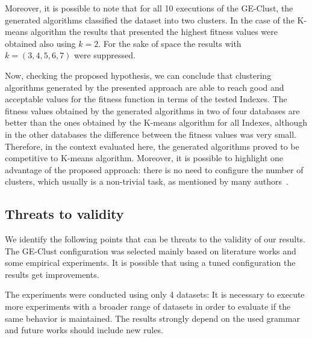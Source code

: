 \documentclass[conference]{IEEEtran}
\begin{document}
	
	Moreover, it is possible to note that for all 10 executions of the GE-Clust, the generated algorithms classified the dataset into two clusters. In the case of the K-means algorithm the results that presented the highest fitness values were obtained also using $k=2$. For the sake of space the results with $k = (3,4,5,6,7)$ were suppressed.
	
	
	
	
	
	Now, checking the proposed hypothesis, we can conclude that clustering algorithms generated by the presented approach are able to reach good and acceptable values for the fitness function in terms of the tested Indexes. The fitness values obtained by the generated algorithms in two of four databases are better than the ones obtained by the K-means algorithm for all Indexes, although in the other databases the difference between the fitness values was very small. Therefore, in the context evaluated here, the generated algorithms proved to be competitive to K-means algorithm. Moreover, it is possible to highlight one advantage of the proposed approach: there is no need to configure the number of clusters, which usually is a non-trivial task, as mentioned by many authors~\cite{tibshirani2001estimating}.
	
	
	\subsection{Threats to validity}
	
	
	We identify the following points that can be threats to the validity of our results. The GE-Clust configuration was selected mainly based on literature works and some empirical experiments. It is possible that using a tuned configuration the results get improvements.
	
	The experiments were conducted using only 4 datasets: It is necessary to execute more experiments with a broader range of datasets in order to evaluate if the same behavior is maintained. The results strongly depend on the used grammar and future works should include new rules.
	
\end{document}
